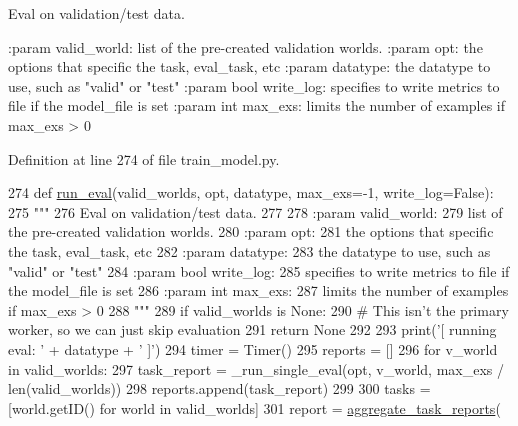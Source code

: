 \begin{DoxyVerb}Eval on validation/test data.

:param valid_world:
    list of the pre-created validation worlds.
:param opt:
    the options that specific the task, eval_task, etc
:param datatype:
    the datatype to use, such as "valid" or "test"
:param bool write_log:
    specifies to write metrics to file if the model_file is set
:param int max_exs:
    limits the number of examples if max_exs > 0
\end{DoxyVerb}
 

Definition at line 274 of file train\+\_\+model.\+py.


\begin{DoxyCode}
274 \textcolor{keyword}{def }\hyperlink{namespaceparlai_1_1scripts_1_1train__model_a496dfe3bf04da9b55d261b4c8d6229a7}{run\_eval}(valid\_worlds, opt, datatype, max\_exs=-1, write\_log=False):
275     \textcolor{stringliteral}{"""}
276 \textcolor{stringliteral}{    Eval on validation/test data.}
277 \textcolor{stringliteral}{}
278 \textcolor{stringliteral}{    :param valid\_world:}
279 \textcolor{stringliteral}{        list of the pre-created validation worlds.}
280 \textcolor{stringliteral}{    :param opt:}
281 \textcolor{stringliteral}{        the options that specific the task, eval\_task, etc}
282 \textcolor{stringliteral}{    :param datatype:}
283 \textcolor{stringliteral}{        the datatype to use, such as "valid" or "test"}
284 \textcolor{stringliteral}{    :param bool write\_log:}
285 \textcolor{stringliteral}{        specifies to write metrics to file if the model\_file is set}
286 \textcolor{stringliteral}{    :param int max\_exs:}
287 \textcolor{stringliteral}{        limits the number of examples if max\_exs > 0}
288 \textcolor{stringliteral}{    """}
289     \textcolor{keywordflow}{if} valid\_worlds \textcolor{keywordflow}{is} \textcolor{keywordtype}{None}:
290         \textcolor{comment}{# This isn't the primary worker, so we can just skip evaluation}
291         \textcolor{keywordflow}{return} \textcolor{keywordtype}{None}
292 
293     print(\textcolor{stringliteral}{'[ running eval: '} + datatype + \textcolor{stringliteral}{' ]'})
294     timer = Timer()
295     reports = []
296     \textcolor{keywordflow}{for} v\_world \textcolor{keywordflow}{in} valid\_worlds:
297         task\_report = \_run\_single\_eval(opt, v\_world, max\_exs / len(valid\_worlds))
298         reports.append(task\_report)
299 
300     tasks = [world.getID() \textcolor{keywordflow}{for} world \textcolor{keywordflow}{in} valid\_worlds]
301     report = \hyperlink{namespaceparlai_1_1core_1_1metrics_ae323045c05ed03d93c260521ebb8bf71}{aggregate\_task\_reports}(

\end{DoxyCode}

